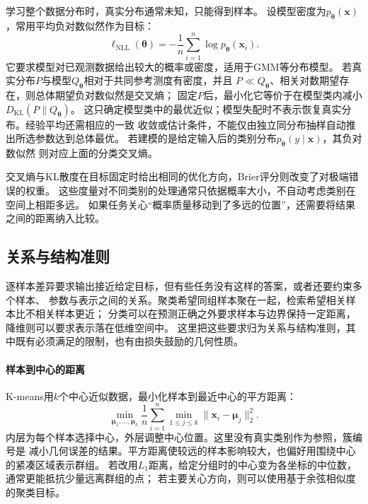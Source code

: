 学习整个数据分布时，真实分布通常未知，只能得到样本。
设模型密度为$p_{\bm{\theta}}(\bm{x})$，常用平均负对数似然作为目标：
\begin{equation}
  \ell_{\mathrm{NLL}}(\bm{\theta})
  =-\frac{1}{n}\sum_{i=1}^{n}\log p_{\bm{\theta}}(\bm{x}_i).
  \label{eq:models-negative-log-likelihood}
\end{equation}
它要求模型对已观测数据给出较大的概率或密度，适用于GMM等分布模型。
若真实分布$P$与模型$Q_{\bm\theta}$相对于共同参考测度有密度，并且
$P\ll Q_{\bm\theta}$、相关对数期望存在，则总体期望负对数似然是交叉熵；
固定$P$后，最小化它等价于在模型类内减小$D_{\mathrm{KL}}(P\|Q_{\bm\theta})$。
这只确定模型类中的最优近似；模型失配时不表示恢复真实分布。经验平均还需相应的一致
收敛或估计条件，不能仅由独立同分布抽样自动推出所选参数达到总体最优。
若建模的是给定输入后的类别分布$p_{\bm{\theta}}(y\mid\bm{x})$，其负对数似然
则对应上面的分类交叉熵。

交叉熵与KL散度在目标固定时给出相同的优化方向，Brier评分则改变了对极端错误的权重。
这些度量对不同类别的处理通常只依据概率大小，不自动考虑类别在空间上相距多远。
如果任务关心“概率质量移动到了多远的位置”，还需要将结果之间的距离纳入比较。

\subsection{关系与结构准则}
\label{sec:models-spatial-objectives}

逐样本差异要求输出接近给定目标，但有些任务没有这样的答案，或者还要约束多个样本、
参数与表示之间的关系。聚类希望同组样本聚在一起，检索希望相关样本比不相关样本更近；
分类可以在预测正确之外要求样本与边界保持一定距离，降维则可以要求表示落在低维空间中。
这里把这些要求归为关系与结构准则，其中既有必须满足的限制，也有由损失鼓励的几何性质。

\paragraph{样本到中心的距离}

K-means用$k$个中心近似数据，最小化样本到最近中心的平方距离：
\begin{equation}
  \min_{\bm{\mu}_1,\ldots,\bm{\mu}_k}
  \frac{1}{n}\sum_{i=1}^{n}\min_{1\leq j\leq k}
  \lVert\bm{x}_i-\bm{\mu}_j\rVert_2^2.
  \label{eq:models-kmeans-objective}
\end{equation}
内层为每个样本选择中心，外层调整中心位置。这里没有真实类别作为参照，簇编号是
减小几何误差的结果。平方距离使较远的样本影响较大，也偏好用围绕中心的紧凑区域表示群组。
若改用$L_1$距离，给定分组时的中心变为各坐标的中位数，通常更能抵抗少量远离群组的点；
若主要关心方向，则可以使用基于余弦相似度的聚类目标。

